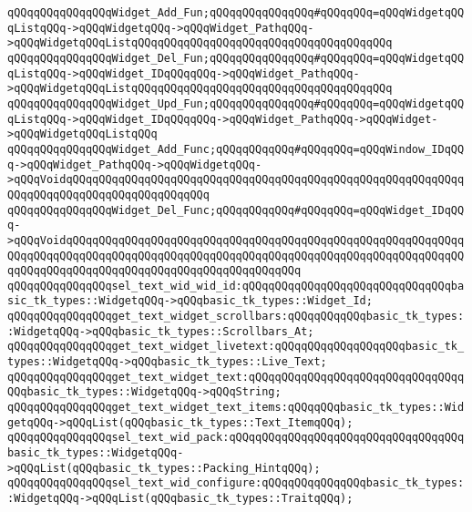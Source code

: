 \verb|qQQqqQQqqQQqqQQqWidget_Add_Fun;qQQqqQQqqQQqqQQq#qQQqqQQq=qQQqWidgetqQQqListqQQq->qQQqWidgetqQQq->qQQqWidget_PathqQQq->qQQqWidgetqQQqListqQQqqQQqqQQqqQQqqQQqqQQqqQQqqQQqqQQqqQQq|\newline
\verb|qQQqqQQqqQQqqQQqWidget_Del_Fun;qQQqqQQqqQQqqQQq#qQQqqQQq=qQQqWidgetqQQqListqQQq->qQQqWidget_IDqQQqqQQq->qQQqWidget_PathqQQq->qQQqWidgetqQQqListqQQqqQQqqQQqqQQqqQQqqQQqqQQqqQQqqQQqqQQq|\newline
\verb|qQQqqQQqqQQqqQQqWidget_Upd_Fun;qQQqqQQqqQQqqQQq#qQQqqQQq=qQQqWidgetqQQqListqQQq->qQQqWidget_IDqQQqqQQq->qQQqWidget_PathqQQq->qQQqWidget->qQQqWidgetqQQqListqQQq|\newline
\newline
\verb|qQQqqQQqqQQqqQQqWidget_Add_Func;qQQqqQQqqQQq#qQQqqQQq=qQQqWindow_IDqQQq->qQQqWidget_PathqQQq->qQQqWidgetqQQq->qQQqVoidqQQqqQQqqQQqqQQqqQQqqQQqqQQqqQQqqQQqqQQqqQQqqQQqqQQqqQQqqQQqqQQqqQQqqQQqqQQqqQQqqQQqqQQqqQQq|\newline
\verb|qQQqqQQqqQQqqQQqWidget_Del_Func;qQQqqQQqqQQq#qQQqqQQq=qQQqWidget_IDqQQq->qQQqVoidqQQqqQQqqQQqqQQqqQQqqQQqqQQqqQQqqQQqqQQqqQQqqQQqqQQqqQQqqQQqqQQqqQQqqQQqqQQqqQQqqQQqqQQqqQQqqQQqqQQqqQQqqQQqqQQqqQQqqQQqqQQqqQQqqQQqqQQqqQQqqQQqqQQqqQQqqQQqqQQqqQQqqQQqqQQqqQQq|\newline
\newline
\newline
\verb|qQQqqQQqqQQqqQQqsel_text_wid_wid_id:qQQqqQQqqQQqqQQqqQQqqQQqqQQqqQQqbasic_tk_types::WidgetqQQq->qQQqbasic_tk_types::Widget_Id;|\newline
\verb|qQQqqQQqqQQqqQQqget_text_widget_scrollbars:qQQqqQQqqQQqbasic_tk_types::WidgetqQQq->qQQqbasic_tk_types::Scrollbars_At;|\newline
\verb|qQQqqQQqqQQqqQQqget_text_widget_livetext:qQQqqQQqqQQqqQQqqQQqbasic_tk_types::WidgetqQQq->qQQqbasic_tk_types::Live_Text;|\newline
\verb|qQQqqQQqqQQqqQQqget_text_widget_text:qQQqqQQqqQQqqQQqqQQqqQQqqQQqqQQqqQQqbasic_tk_types::WidgetqQQq->qQQqString;|\newline
\verb|qQQqqQQqqQQqqQQqget_text_widget_text_items:qQQqqQQqbasic_tk_types::WidgetqQQq->qQQqList(qQQqbasic_tk_types::Text_ItemqQQq);|\newline
\verb|qQQqqQQqqQQqqQQqsel_text_wid_pack:qQQqqQQqqQQqqQQqqQQqqQQqqQQqqQQqqQQqbasic_tk_types::WidgetqQQq->qQQqList(qQQqbasic_tk_types::Packing_HintqQQq);|\newline
\verb|qQQqqQQqqQQqqQQqsel_text_wid_configure:qQQqqQQqqQQqqQQqbasic_tk_types::WidgetqQQq->qQQqList(qQQqbasic_tk_types::TraitqQQq);|\newline
